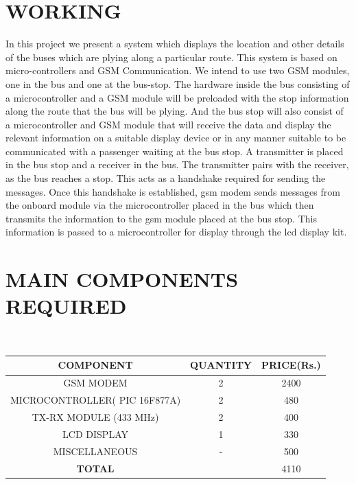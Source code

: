 \documentclass[12pt,a4paper,oneside]{report}
\begin{document}
\begin{onehalfspacing}
\begin{enumerate}
\begin{figure}[h]
\label{fig3}
\end{figure}

\newpage
\section{WORKING}
\par
\hspace{.7cm}
In this project we present a system which displays the location and other details of the buses which are plying along a particular route. This system is based on micro-controllers and GSM Communication. We intend to use two GSM modules, one in the bus and one at the bus-stop. The hardware inside the bus consisting of a microcontroller and a GSM module will be preloaded with the stop information along the route that the bus will be plying. And the bus stop will also consist of a microcontroller and GSM module that will receive the data and display the relevant information on a suitable display device or in any manner suitable to be communicated with a passenger waiting at the bus stop.
   A transmitter is placed in the bus stop and a receiver in the bus. The transmitter pairs with the receiver, as the bus reaches a stop. This acts as a handshake required for sending the messages. Once this handshake is established, gsm modem sends messages from the onboard module via the microcontroller placed in the bus which then transmits the information to the gsm module placed at the bus stop. This information is passed to a microcontroller for display through the lcd display kit. 

\section{MAIN COMPONENTS REQUIRED}
{$\;\;\;\;$}	
\begin{table}[h]
\begin{tabular}{|c|c|c|}
\hline
\textbf{COMPONENT} & \textbf{QUANTITY} & \textbf{PRICE(Rs.)}\\
\hline
GSM MODEM & 2 & 2400\\
MICROCONTROLLER( PIC 16F877A) & 2 & 480\\
TX-RX MODULE (433 MHz) & 2 & 400\\
LCD DISPLAY & 1 & 330\\
MISCELLANEOUS	& - & 500\\
\hline
\textbf{TOTAL}	& & 4110\\
\hline

\end{tabular}
\end{table}


\end{enumerate}
\end{onehalfspacing}
\end{document}
